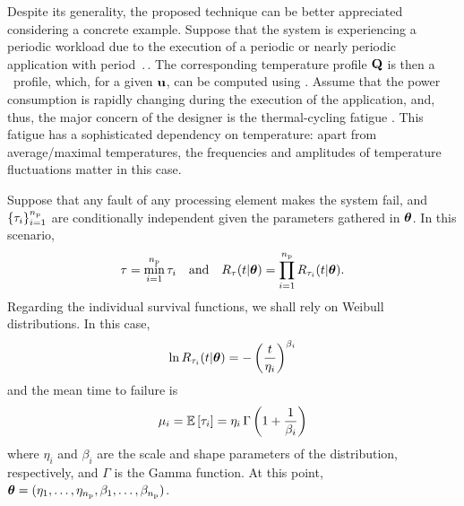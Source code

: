 Despite its generality, the proposed technique can be better appreciated considering a concrete example.
Suppose that the system is experiencing a periodic workload due to the execution of a periodic or nearly periodic application with period $\period$.
The corresponding temperature profile $\mathbf{Q}$ is then a \DSS\ profile, which, for a given $\mathbf{u}$, can be computed using .
Assume that the power consumption is rapidly changing during the execution of the application, and, thus, the major concern of the designer is the thermal-cycling fatigue \cite{jedec}.
This fatigue has a sophisticated dependency on temperature: apart from average/maximal temperatures, the frequencies and amplitudes of temperature fluctuations matter in this case.

Suppose that any fault of any processing element makes the system fail, and $\{ \tau_i \}_{i = 1}^{n_\text{p}}$ are conditionally independent given the parameters gathered in $\bm{\theta}$.
In this scenario,
\[
  \tau = \min_{i = 1}^{n_\text{p}} \tau_i \hspace{1em} \text{and} \hspace{1em} R_\tau(t | \bm{\theta}) = \prod_{i = 1}^{n_\text{p}} R_{\tau_i}(t | \bm{\theta}).
\]
Regarding the individual survival functions, we shall rely on Weibull distributions.
In this case,
\begin{equation} \elab{weibull-model}
  \ln \survival_{\T_i}(\t | \pvw) = -\left( \frac{\t}{\eta_i} \right)^{\beta_i}
\end{equation}
and the mean time to failure is
\begin{equation} \elab{weibull-expectation}
  \mu_i = \expectation{\T_i} = \eta_i \, \Gamma\left(1 + \frac{1}{\beta_i}\right)
\end{equation}
where $\eta_i$ and $\beta_i$ are the scale and shape parameters of the distribution, respectively, and $\Gamma$ is the Gamma function.
At this point, $\bm{\theta} = (\eta_1, \dotsc, \eta_{n_\text{p}}, \beta_1, \dotsc, \beta_{n_\text{p}})$.

